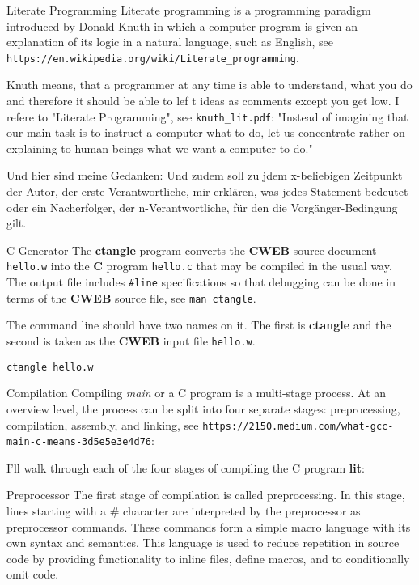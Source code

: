 

Literate Programming  \hfill \break
Literate programming is a programming paradigm introduced by Donald Knuth in
which a computer program is given an explanation of its logic in a natural
language, such as English,
see {\tt https://en.wikipedia.org/wiki/Literate\_programming}.

\vskip 4pt \noindent
Knuth means, that a programmer at any time is able to understand,
what you do and therefore it should be able to lef t ideas
as comments except you get low. I refere to "Literate Programming", see
{\tt knuth\_lit.pdf}: "Instead of imagining that our
main task is to instruct a computer what to do, let us
concentrate rather on explaining to human beings what
we want a computer to do."

Und hier sind meine Gedanken:
Und zudem soll zu jdem x-beliebigen Zeitpunkt
der Autor, der erste Verantwortliche, mir erklären, was jedes Statement
bedeutet oder ein Nacherfolger, der n-Verantwortliche, für den die
Vorgänger-Bedingung gilt.

\fi

C-Generator  \hfill \break
The {\bf ctangle} program converts the {\bf CWEB} source document {\tt hello.w}
into the {\bf C} program {\tt hello.c} that may be compiled in the usual way.
The output file includes{ \tt \#line} specifications so that debugging can be
done in terms of the {\bf CWEB} source file, see {\tt man ctangle}.

\vskip 4pt \noindent
The command line should have two names on it. The first is {\bf ctangle} and
the
second is taken as the {\bf CWEB} input file {\tt hello.w}.

\vskip 4pt \noindent
{\tt ctangle hello.w}

\fi

Compilation \hfill \break
Compiling {\sl main} or a C program is a multi-stage process. At an overview
level, the process can be split into four separate stages: preprocessing,
compilation, assembly, and linking, \hfill \break
see {\tt https://2150.medium.com/what-gcc-main-c-means-3d5e5e3e4d76}:

\vskip 4pt \noindent
I'll walk through each of the four stages of compiling the C program {\bf lit}:

\fi

Preprocessor  \hfill \break
The first stage of compilation is called preprocessing. In this stage,
lines starting with a \# character are interpreted by the preprocessor as
preprocessor commands. These commands form a simple macro language with its own
syntax and semantics. This language is used to reduce repetition in source code
by providing functionality to inline files, define macros, and to conditionally
omit code.

